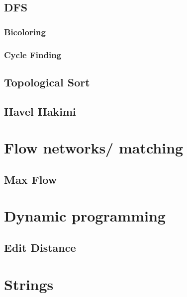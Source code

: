 \documentclass[1pt]{report}
\begin{document}
\section{DFS}
\subsection{Bicoloring}

\subsection{Cycle Finding}

\section{Topological Sort}

\section{Havel Hakimi}



\chapter{Flow networks/ matching}
\section{Max Flow}



\chapter{Dynamic programming}
\section{Edit Distance}



\chapter{Strings}
\end{document}
